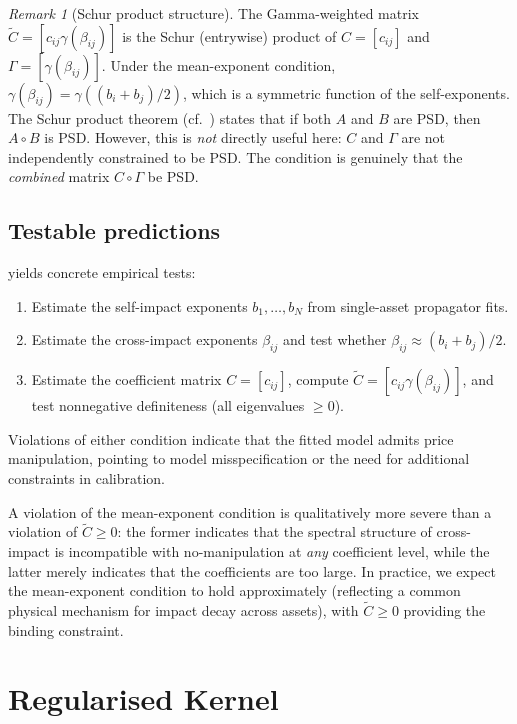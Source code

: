 \documentclass[12pt]{article}
\theoremstyle{definition}
\theoremstyle{remark}
\newtheorem{remark}[theorem]{Remark}
\newcommand{\bC}{\widetilde{C}}
\begin{document}
\begin{remark}[Schur product structure]
The Gamma-weighted matrix $\bC = [c_{ij}\gamma(\beta_{ij})]$ is the Schur (entrywise) product
of $C = [c_{ij}]$ and $\Gamma = [\gamma(\beta_{ij})]$.  Under the mean-exponent condition,
$\gamma(\beta_{ij}) = \gamma((b_i+b_j)/2)$, which is a symmetric function of the
self-exponents.  The Schur product theorem
(cf.~\cite[\S5.2]{HornJohnson2013}) states that if both $A$ and $B$ are PSD, then
$A\circ B$ is PSD.  However, this is \emph{not} directly useful here: $C$ and $\Gamma$
are not independently constrained to be PSD.  The condition is genuinely that the
\emph{combined} matrix $C\circ\Gamma$ be PSD.
\end{remark}

\subsection{Testable predictions}\label{sec:testable}

 yields concrete empirical tests:
\begin{enumerate}[nosep]
\item Estimate the self-impact exponents $b_1,\dots,b_N$ from single-asset propagator fits.
\item Estimate the cross-impact exponents $\beta_{ij}$ and test whether
  $\beta_{ij}\approx(b_i+b_j)/2$.
\item Estimate the coefficient matrix $C=[c_{ij}]$, compute
  $\bC=[c_{ij}\gamma(\beta_{ij})]$, and test nonnegative definiteness (all eigenvalues
  $\ge 0$).
\end{enumerate}
Violations of either condition indicate that the fitted model admits price manipulation,
pointing to model misspecification or the need for additional constraints in calibration.

A violation of the mean-exponent condition is qualitatively more severe than a violation
of $\bC\ge 0$: the former indicates that the spectral structure of cross-impact is
incompatible with no-manipulation at \emph{any} coefficient level, while the latter
merely indicates that the coefficients are too large.  In practice, we expect the
mean-exponent condition to hold approximately (reflecting a common physical mechanism
for impact decay across assets), with $\bC\ge 0$ providing the binding constraint.


\section{Regularised Kernel}\label{sec:regularised}
\end{document}
